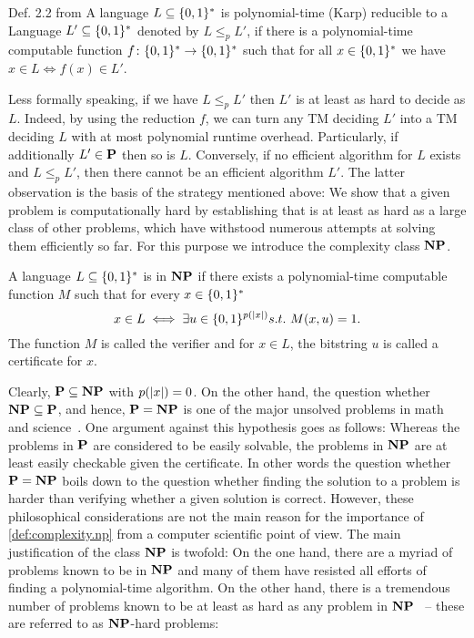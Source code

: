 \begin{definition}{Def. 2.2 from \cite{Arora_2009_Computational}}
  \label{def:complexity.reducibility}
  A language $L \subset \BitStrings$ is polynomial-time (Karp) reducible to a Language $L' \subset \BitStrings$ denoted by $L \le_p L'$, if there is a polynomial-time computable function $f\colon \BitStrings \to \BitStrings$ such that for all $x \in \BitStrings$ we have $x \in L \iff f(x) \in L'$.
\end{definition}

Less formally speaking, if we have $L \le_p L'$ then $L'$ is at least as hard to decide as $L$.
Indeed, by using the reduction $f$, we can turn any TM deciding $L'$ into a TM deciding $L$ with at most polynomial runtime overhead.
Particularly, if additionally $L' \in \P$ then so is $L$.
Conversely, if no efficient algorithm for $L$ exists and $L \le_p L'$, then there cannot be an efficient algorithm $L'$.
The latter observation is the basis of the strategy mentioned above:
We show that a given problem is computationally hard by establishing that is at least as hard as a large class of other problems, which have withstood numerous attempts at solving them efficiently so far.
For this purpose we introduce the complexity class $\NP$.

\begin{definition}
  \label{def:complexity.np}
  A language $L \subset \BitStrings$ is in $\NP$ if there exists a polynomial-time computable function $M$ such that for every $x \in \BitStrings$
  \[
    x \in L \iff \exists u \in \{ 0, 1 \}^{p(\abs{x})} s.t.\ M(x, u) = 1.
  \]
  The function $M$ is called the verifier and for $x \in L$, the bitstring $u$ is called a certificate for $x$.
\end{definition}

Clearly, $\P \subset \NP$ with $p(\abs{x}) = 0$.
On the other hand, the question whether $\NP \subset \P$, and hence, $\P = \NP$ is one of the major unsolved problems in math and science~\cite{Cook_2000_P,Aaronson_????_P,Garey_2002_Computers}.
One argument against this hypothesis goes as follows:
Whereas the problems in $\P$ are considered to be easily solvable, the problems in $\NP$ are at least easily checkable given the certificate.
In other words the question whether $\P = \NP$ boils down to the question whether finding the solution to a problem is harder than verifying whether a given solution is correct.
However, these philosophical considerations are not the main reason for the importance of \cref{def:complexity.np} from a computer scientific point of view.
The main justification of the class $\NP$ is twofold:
On the one hand, there are a myriad of problems known to be in $\NP$ and many of them have resisted all efforts of finding a polynomial-time algorithm.
On the other hand, there is a tremendous number of problems known to be at least as hard as any problem in $\NP$~\cite{Garey_2002_Computers} -- these are referred to as $\NP$-hard problems:

